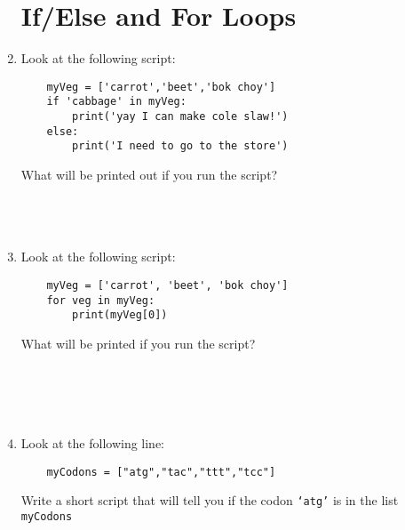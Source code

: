 \documentclass[11pt]{article}
\begin{document}
\begin{enumerate}
\section*{If/Else and For Loops}
\item Look at the following script:
\begin{verbatim}
    myVeg = ['carrot','beet','bok choy']
    if 'cabbage' in myVeg:
        print('yay I can make cole slaw!')
    else:
        print('I need to go to the store')
\end{verbatim}

What will be printed out if you run the script?\\
\\
\\
\\
\item Look at the following script:
\begin{verbatim}
    myVeg = ['carrot', 'beet', 'bok choy']
    for veg in myVeg:
        print(myVeg[0])
\end{verbatim}
What will be printed if you run the script?\\
\\
\\
\\
\\

\item Look at the following line:
\begin{verbatim}
    myCodons = ["atg","tac","ttt","tcc"]
\end{verbatim}
Write a short script that will tell you if the codon \texttt{`atg'} is in the list \texttt{myCodons}\\ 
\\
\\
\\
\\
\\
\\
\\
\\
\\
\\


\end{enumerate}
\end{document}
